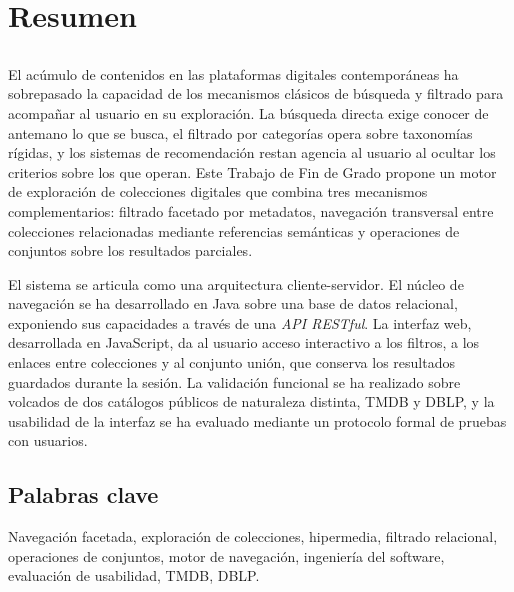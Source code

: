 \chapter*{Resumen}

\section*{\tituloPortadaVal}

El acúmulo de contenidos en las plataformas digitales contemporáneas ha sobrepasado la capacidad
de los mecanismos clásicos de búsqueda y filtrado para acompañar al usuario en su exploración.
La búsqueda directa exige conocer de antemano lo que se busca, el filtrado por categorías opera
sobre taxonomías rígidas, y los sistemas de recomendación restan agencia al usuario al ocultar
los criterios sobre los que operan. Este Trabajo de Fin de Grado propone un motor de exploración
de colecciones digitales que combina tres mecanismos complementarios: filtrado facetado por
metadatos, navegación transversal entre colecciones relacionadas mediante referencias semánticas
y operaciones de conjuntos sobre los resultados parciales.

El sistema se articula como una arquitectura cliente-servidor. El núcleo de navegación se ha
desarrollado en Java sobre una base de datos relacional, exponiendo sus capacidades a través
de una \textit{API RESTful}. La interfaz web, desarrollada en JavaScript, da al usuario acceso
interactivo a los filtros, a los enlaces entre colecciones y al conjunto unión, que conserva
los resultados guardados durante la sesión. La validación funcional se ha realizado sobre
volcados de dos catálogos públicos de naturaleza distinta, TMDB y DBLP, y la usabilidad de la
interfaz se ha evaluado mediante un protocolo formal de pruebas con usuarios.


\section*{Palabras clave}

\noindent Navegación facetada, exploración de colecciones, hipermedia, filtrado relacional,
operaciones de conjuntos, motor de navegación, ingeniería del software, evaluación de
usabilidad, TMDB, DBLP.
